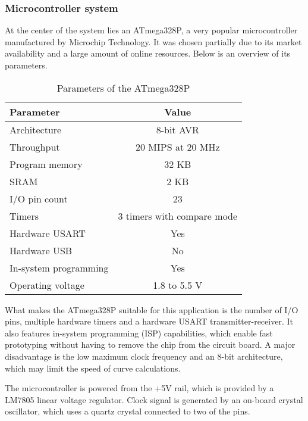 \subsubsection{Microcontroller system}

At the center of the system lies an ATmega328P, a very popular microcontroller
manufactured by Microchip Technology. It was chosen partially due to its market
availability and a large amount of online resources. Below is an overview
of its parameters.

\begin{table}[ht]
    \begin{center}
        \begin{tabular}{ |l|c| }
            \hline
            Parameter & Value \\
            \hline
            Architecture & 8-bit AVR \\
            Throughput & 20 MIPS at 20 MHz \\
            Program memory & 32 KB \\
            SRAM & 2 KB \\
            I/O pin count & 23 \\
            Timers & 3 timers with compare mode \\
            Hardware USART & Yes \\
            Hardware USB & No \\
            In-system programming & Yes \\
            Operating voltage & 1.8 to 5.5 V \\
            \hline
        \end{tabular}
        \caption{Parameters of the ATmega328P \cite{atmega328p}}
    \end{center}
\end{table}

What makes the ATmega328P suitable for this application is the number of I/O
pins, multiple hardware timers and a hardware USART transmitter-receiver.
It also features in-system programming (ISP) capabilities, which enable fast
prototyping without having to remove the chip from the circuit board. A major
disadvantage is the low maximum clock frequency and an 8-bit architecture, which
may limit the speed of curve calculations.

The microcontroller is powered from the +5V rail, which is provided by a LM7805
linear voltage regulator. Clock signal is generated by an on-board crystal
oscillator, which uses a quartz crystal connected to two of the pins.

